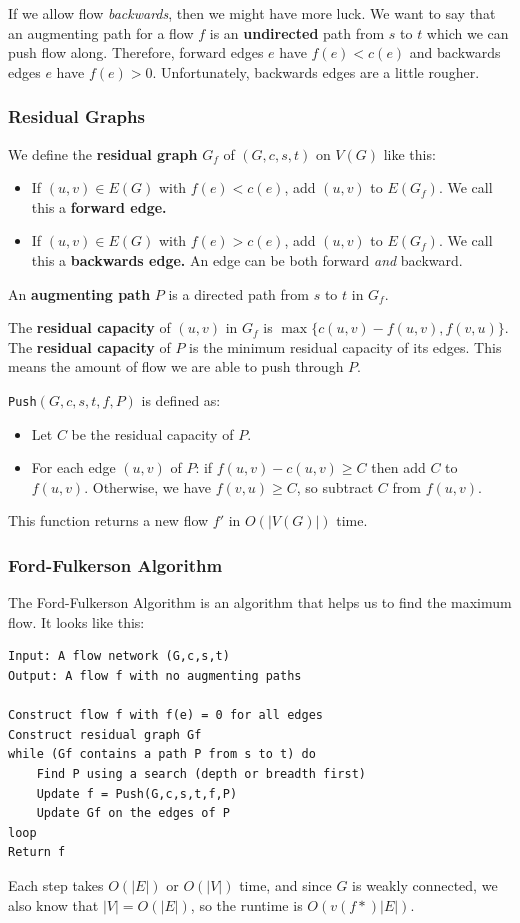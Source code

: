 \documentclass[11pt,a4paper,titlepage,dvipsnames,cmyk]{scrartcl}
\begin{document}
If we allow flow \textit{backwards}, then we might have more luck. We want
to say that an augmenting path for a flow $f$ is an \textbf{undirected}
path from $s$ to $t$ which we can push flow along. Therefore, forward
edges $e$ have $f(e) < c(e)$ and backwards edges $e$ have $f(e) > 0$.
Unfortunately, backwards edges are a little rougher.

\subsubsection{Residual Graphs}%
\label{ssub:residual-graphs}
We define the \textbf{residual graph} $G_f$ of $(G,c,s,t)$ on $V(G)$ like
this:
\begin{itemize}
    \item If $(u,v) \in E(G)$ with $f(e) < c(e)$, add $(u,v)$ to $E(G_f)$.
        We call this a \textbf{forward edge.}
    \item If $(u,v) \in E(G)$ with $f(e) > c(e)$, add $(u,v)$ to $E(G_f)$.
        We call this a \textbf{backwards edge.} An edge can be both
        forward \textit{and} backward.
\end{itemize}

An \textbf{augmenting path} $P$ is a directed path from $s$ to $t$ in
$G_f$.

The \textbf{residual capacity} of $(u,v)$ in $G_f$ is $\max\{c(u,v) -
f(u,v),f(v,u)\}$. The \textbf{residual capacity} of $P$ is the minimum
residual capacity of its edges. This means the amount of flow we are able
to push through $P$.

\texttt{Push}$(G,c,s,t,f,P)$ is defined as:
\begin{itemize}
    \item Let $C$ be the residual capacity of $P$.
    \item For each edge $(u,v)$ of $P$: if $f(u,v) - c(u,v) \ge C$ then
        add $C$ to $f(u,v)$. Otherwise, we have $f(v,u) \ge C$, so
        subtract $C$ from $f(u,v)$.
\end{itemize}

This function returns a new flow $f'$ in $O(|V(G)|)$ time.

\subsubsection{Ford-Fulkerson Algorithm}%
\label{ssub:ford-fulkerson}
The Ford-Fulkerson Algorithm is an algorithm that helps us to find the
maximum flow. It looks like this:
\begin{lstlisting}
Input: A flow network (G,c,s,t)
Output: A flow f with no augmenting paths

Construct flow f with f(e) = 0 for all edges
Construct residual graph Gf
while (Gf contains a path P from s to t) do
    Find P using a search (depth or breadth first)
    Update f = Push(G,c,s,t,f,P)
    Update Gf on the edges of P
loop
Return f
\end{lstlisting}

Each step takes $O(|E|)$ or $O(|V|)$ time, and since $G$ is weakly
connected, we also know that $|V| = O(|E|)$, so the runtime is
$O(v(f*)|E|)$.
\end{document}
